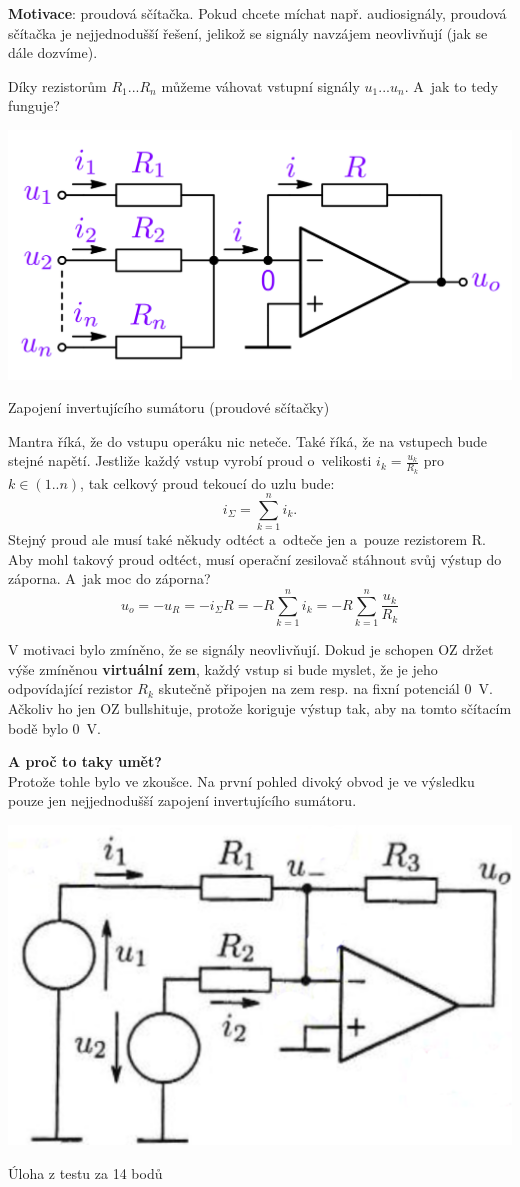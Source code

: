 \documentclass[a4paper,12pt]{article}   %
\begin{document}
\textbf{Motivace}: proudová sčítačka. Pokud chcete míchat např. audiosignály, proudová sčítačka je nejjednodušší řešení, jelikož se signály navzájem neovlivňují (jak se dále dozvíme).

Díky rezistorům $R_1 ... R_n$ můžeme váhovat vstupní signály $u_1 ... u_n$. A~jak to tedy funguje?

\begin{schema}[h!]
    \centering
    \includegraphics[width=.5\textwidth]{invert-sumator.PNG}
    \caption{Zapojení invertujícího sumátoru (proudové sčítačky)}
    \label{sch:sumator}
\end{schema}

Mantra říká, že do vstupu operáku nic neteče. Také říká, že na vstupech bude stejné napětí. Jestliže každý vstup vyrobí proud o~velikosti $i_k = \frac{u_k}{R_k}$ pro $k\in (1..n)$, tak celkový proud tekoucí do uzlu bude:
\begin{equation*}
    i_\Sigma=\sum_{k=1}^n i_k.
\end{equation*}
Stejný proud ale musí také někudy odtéct a~odteče jen a~pouze rezistorem R. Aby mohl takový proud odtéct, musí operační zesilovač stáhnout svůj výstup do záporna. A~jak moc do záporna?
\begin{equation}
    u_o = -u_R = -i_\Sigma R = -R \sum_{k=1}^n i_k = -R \sum_{k=1}^n \frac{u_k}{R_k}
\end{equation}

V motivaci bylo zmíněno, že se signály neovlivňují. Dokud je schopen OZ držet výše zmíněnou \textbf{virtuální zem}, každý vstup si bude myslet, že je jeho odpovídající rezistor $R_k$ skutečně připojen na zem resp. na fixní potenciál 0~V. Ačkoliv ho jen OZ bullshituje, protože koriguje výstup tak, aby na tomto sčítacím bodě bylo 0~V.

\textbf{A proč to taky umět?}\\
Protože tohle bylo ve zkoušce. Na první pohled divoký obvod je ve výsledku pouze jen nejjednodušší zapojení invertujícího sumátoru.
\begin{schema}
    \centering
    \includegraphics[width=.3\textwidth]{proudova_scitacka.PNG}
    \caption{Úloha z testu za 14 bodů}
\end{schema}
\end{document}
